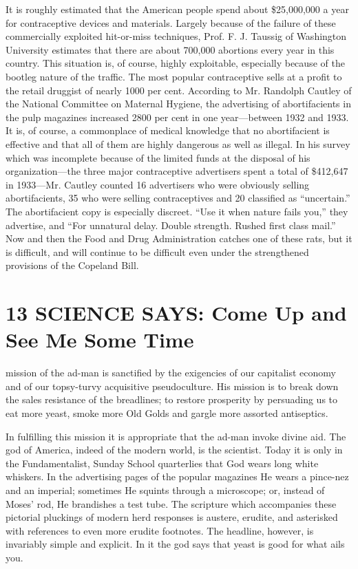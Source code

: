 \documentclass[twoside,nohyper,openany,nobib]{tufte-book}
\let\oldchapter\chapter
\def\chapter{%
  \setcounter{footnote}{0}%
  \oldchapter
}
\begin{document}
It is roughly estimated that the American people spend about
\$25,000,000 a year for contraceptive devices and materials. Largely
because of the failure of these commercially exploited hit-or-miss
techniques, Prof. F. J. Taussig of Washington University estimates that
there are about 700,000 abortions every year in this country. This
situation is, of course, highly exploitable, especially because of the
bootleg nature of the traffic. The most popular contraceptive sells at a
profit to the retail druggist of nearly 1000 per cent. According to Mr.
Randolph Cautley of the National Committee on Maternal Hygiene, the
advertising of abortifacients in the pulp magazines increased 2800 per
cent in one year---between 1932 and 1933. It is, of course, a
commonplace of medical knowledge that no abortifacient is effective and
that all of them are highly dangerous as well as illegal. In his survey
which was incomplete because of the limited funds at the disposal of his
organization---the three major contraceptive advertisers spent a total
of \$412,647 in 1933---Mr. Cautley counted 16 advertisers who were
obviously selling abortifacients, 35 who were selling contraceptives and
20 classified as ``uncertain.'' The abortifacient copy is especially
discreet. ``Use it when nature fails you,'' they advertise, and ``For
unnatural delay. Double strength. Rushed first class mail.'' Now and
then the Food and Drug Administration catches one of these rats, but it
is difficult, and will continue to be difficult even under the
strengthened provisions of the Copeland Bill.
 

\chapter[13 \hspace*{1mm} SCIENCE SAYS: Come Up and See Me Some Time]{13 SCIENCE SAYS: Come Up and See Me Some Time}

 mission of the ad-man is sanctified by the exigencies of our
capitalist economy and of our topsy-turvy acquisitive pseudoculture. His
mission is to break down the sales resistance of the breadlines; to
restore prosperity by persuading us to eat more yeast, smoke more Old
Golds and gargle more assorted antiseptics.

In fulfilling this mission it is appropriate that the ad-man invoke
divine aid. The god of America, indeed of the modern world, is the
scientist. Today it is only in the Fundamentalist, Sunday School
quarterlies that God wears long white whiskers. In the advertising pages
of the popular magazines He wears a pince-nez and an imperial; sometimes
He squints through a microscope; or, instead of Moses' rod, He
brandishes a test tube. The scripture which accompanies these pictorial
pluckings of modern herd responses is austere, erudite, and asterisked
with references to even more erudite footnotes. The headline, however,
is invariably simple and explicit. In it the god says that yeast is good
for what ails you.
\end{document}
